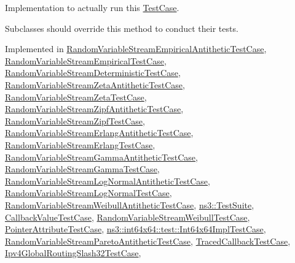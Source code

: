 Implementation to actually run this \hyperlink{classns3_1_1TestCase}{Test\+Case}. 

Subclasses should override this method to conduct their tests. 

Implemented in \hyperlink{classRandomVariableStreamEmpiricalAntitheticTestCase_aff8e13cf80352999319d7600e2324d26}{Random\+Variable\+Stream\+Empirical\+Antithetic\+Test\+Case}, \hyperlink{classRandomVariableStreamEmpiricalTestCase_ad5071e15b94fe711389e8cbf52854852}{Random\+Variable\+Stream\+Empirical\+Test\+Case}, \hyperlink{classRandomVariableStreamDeterministicTestCase_a4bff522d0b0939d6e6a155faaba326af}{Random\+Variable\+Stream\+Deterministic\+Test\+Case}, \hyperlink{classRandomVariableStreamZetaAntitheticTestCase_ac97c0559c3511e171350fabb6a5e8c74}{Random\+Variable\+Stream\+Zeta\+Antithetic\+Test\+Case}, \hyperlink{classRandomVariableStreamZetaTestCase_a7618faf8620a51f1ed56e1c7e10f3d1f}{Random\+Variable\+Stream\+Zeta\+Test\+Case}, \hyperlink{classRandomVariableStreamZipfAntitheticTestCase_a09c7d1e05440c0621417aed87b8e67ac}{Random\+Variable\+Stream\+Zipf\+Antithetic\+Test\+Case}, \hyperlink{classRandomVariableStreamZipfTestCase_a85704e09590df03d979c956f514d4e2d}{Random\+Variable\+Stream\+Zipf\+Test\+Case}, \hyperlink{classRandomVariableStreamErlangAntitheticTestCase_acf2136fbba962cfd8a9654c08175079b}{Random\+Variable\+Stream\+Erlang\+Antithetic\+Test\+Case}, \hyperlink{classRandomVariableStreamErlangTestCase_a54853fd9902c0aeabd501845ebcd3f6d}{Random\+Variable\+Stream\+Erlang\+Test\+Case}, \hyperlink{classRandomVariableStreamGammaAntitheticTestCase_ad5df183b68d515005c4759f7456c372a}{Random\+Variable\+Stream\+Gamma\+Antithetic\+Test\+Case}, \hyperlink{classRandomVariableStreamGammaTestCase_aa1a9e09d67bfb3985156919da14d76ad}{Random\+Variable\+Stream\+Gamma\+Test\+Case}, \hyperlink{classRandomVariableStreamLogNormalAntitheticTestCase_a723deffbfad7dbfbeecee15109aa20fc}{Random\+Variable\+Stream\+Log\+Normal\+Antithetic\+Test\+Case}, \hyperlink{classRandomVariableStreamLogNormalTestCase_ab6ee956d829eb26ba949e3a4d99c6996}{Random\+Variable\+Stream\+Log\+Normal\+Test\+Case}, \hyperlink{classRandomVariableStreamWeibullAntitheticTestCase_a646eb24fbaafc1bc472f5b4c742df0d6}{Random\+Variable\+Stream\+Weibull\+Antithetic\+Test\+Case}, \hyperlink{classns3_1_1TestSuite_aa465ac6b0e9cd11022525091f78f3cf0}{ns3\+::\+Test\+Suite}, \hyperlink{classCallbackValueTestCase_acef10b69657dec994e6446f6b0d08291}{Callback\+Value\+Test\+Case}, \hyperlink{classRandomVariableStreamWeibullTestCase_aadc4348a5a7104c06a21c74db07c793e}{Random\+Variable\+Stream\+Weibull\+Test\+Case}, \hyperlink{classPointerAttributeTestCase_a4dd7258b7c7146be0a0ba69b9b5633d9}{Pointer\+Attribute\+Test\+Case}, \hyperlink{classns3_1_1int64x64_1_1test_1_1Int64x64ImplTestCase_a82e8afadc99788795f2cf093d68b22ee}{ns3\+::int64x64\+::test\+::\+Int64x64\+Impl\+Test\+Case}, \hyperlink{classRandomVariableStreamParetoAntitheticTestCase_a999b8b871b30cd7275bba0953979ecd2}{Random\+Variable\+Stream\+Pareto\+Antithetic\+Test\+Case}, \hyperlink{classTracedCallbackTestCase_af901e0ed1e263452efcd2f4c9ebbba47}{Traced\+Callback\+Test\+Case}, \hyperlink{classIpv4GlobalRoutingSlash32TestCase_a261a15e240910fb1981571e8e6cb294f}{Ipv4\+Global\+Routing\+Slash32\+Test\+Case}, 